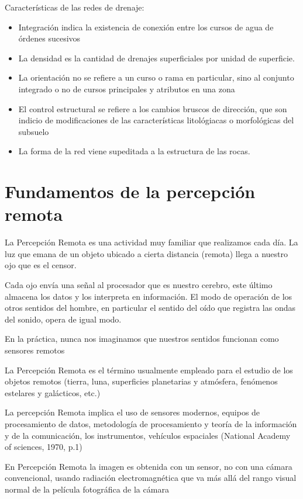 Características de las redes de drenaje: 
\begin{itemize}
  \item Integración indica la existencia de conexión entre los cursos de agua de órdenes sucesivos 
  \item La densidad es la cantidad de drenajes superficiales por unidad de superficie.
  \item La orientación no se refiere a un curso o rama en particular, sino al conjunto integrado o no de cursos principales y atributos en una zona
  \item El control estructural se refiere a los cambios bruscos de dirección, que son indicio de modificaciones de las características litológiacas o morfológicas del subsuelo
  \item La forma de la red viene supeditada a la estructura de las rocas.
\end{itemize}

\section{Fundamentos de la percepción remota}

La Percepción Remota es una actividad muy familiar que realizamos  cada día. La luz que emana de un  objeto ubicado a cierta distancia (remota) llega a nuestro ojo que es el censor. 

Cada ojo envía una señal al procesador que es nuestro cerebro, este último almacena los datos y los interpreta en información. 
        El modo de operación de los otros sentidos del hombre, en particular el sentido del oído que registra las ondas del sonido, opera de igual modo.
 
En la práctica, nunca nos imaginamos que nuestros sentidos funcionan como sensores remotos

La Percepción Remota es el término usualmente empleado para el 
estudio de los objetos remotos (tierra, luna, superficies planetarias y atmósfera, fenómenos estelares y galácticos, etc.)

La percepción Remota implica el uso de sensores modernos, equipos de procesamiento de datos, metodología de procesamiento y teoría de la información y de la comunicación, los instrumentos, vehículos espaciales (National Academy of sciences, 1970, p.1)

En Percepción Remota la imagen es obtenida con un sensor, no con  
una cámara convencional, usando radiación electromagnética que va 
más allá  del rango visual normal de la película fotográfica de la cámara

